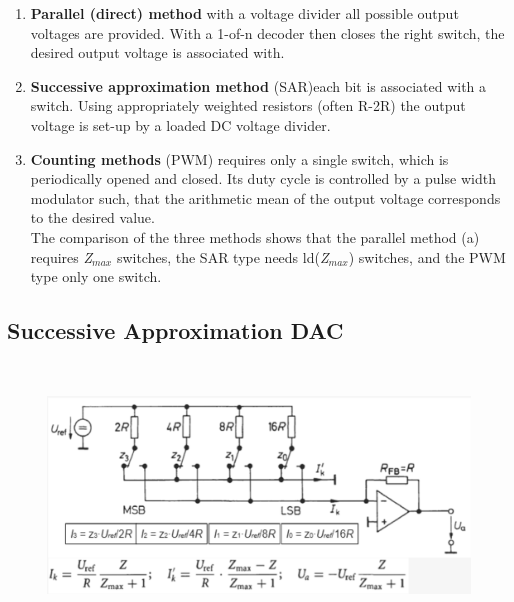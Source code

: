 \os{\newpage}

\begin{enumerate}
\item \textbf{Parallel (direct) method} with a voltage divider all possible output voltages are provided. With a 1-of-n decoder then closes the right switch, the desired output voltage is associated with.

\item \textbf{Successive approximation method} (SAR)each bit is associated with a switch. Using appropriately weighted resistors (often R-2R) the output voltage is set-up by a loaded DC voltage divider.

\item \textbf{Counting methods} (PWM) requires only a single switch, which is periodically opened and closed. Its duty cycle is controlled by a pulse width modulator such, that the arithmetic mean of the output voltage corresponds to the desired value.\\

The comparison of the three methods shows that the parallel method (a) requires \textit{Z${}_{max}$} switches, the SAR type needs ld(\textit{Z${}_{max}$}) switches, and the PWM type only one switch. \\

\end{enumerate}
\newpage

\subsection{Successive Approximation DAC}

    \begin{figure}[h]
    \centering
    \includegraphics[width=14cm, height=7cm]{Images/image32.png}
    \label{fig:Fig 119}
    \end{figure}

